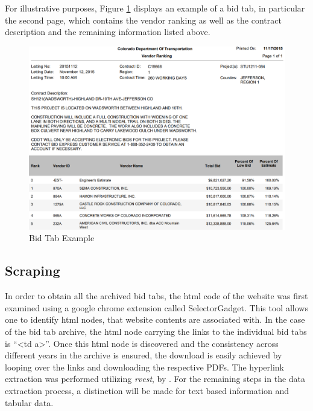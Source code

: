 \documentclass[a4paper,12pt, headsepline]{scrartcl}
\numberwithin{equation}{section}
\begin{document}
For illustrative purposes, Figure \ref{fig:bidtab} displays an example of a bid tab, in particular the second page, which contains the vendor ranking as well as the contract description and the remaining information listed above.

\begin{figure}[H]
	\includegraphics[width = 14	cm]{figures/Bid_Tab_exmpl.PNG}
	\caption{Bid Tab Example}\label{fig:bidtab}
\end{figure}

\subsection{Scraping}\label{subsec:scrap}
In order to obtain all the archived bid tabs, the html code of the website was first examined using a google chrome extension called SelectorGadget. This tool allows one to identify html nodes, that website contents are associated with. In the case of the bid tab archive, the html node carrying the links to the individual bid tabs is \enquote{<td a>}. Once this html node is discovered and the consistency across different years in the archive is ensured, the download is easily achieved by looping over the links and downloading the  respective PDFs. The hyperlink extraction was performed utilizing \textit{rvest}, by \citet{rvest}. For the remaining steps in the data extraction process, a distinction will be made for text based information and tabular data.
\end{document}
